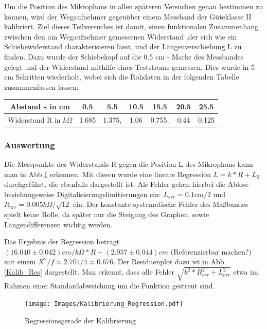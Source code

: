 \documentclass[]{article}
\begin{document}
	Um die Position des Mikrophons in allen späteren Versuchen genau bestimmen zu können, wird der Wegaufnehmer gegenüber einem Messband der Güteklasse II kalibriert. Ziel dieses Teilversuches ist damit, einen funktionalen Zusammenhang zwischen den am Wegaufnehmer gemessenen Widerstand ,der sich wie ein Schiebewiderstand charakterisieren lässt, und der Längenverschiebung L zu finden. Dazu wurde der Schiebekopf auf die 0.5 cm - Marke des Messbandes gelegt und der Widerstand mithilfe eines Teststroms gemessen. Dies wurde in 5-cm Schritten wiederholt, wobei sich die Rohdaten in der folgenden Tabelle zusammenfassen lassen:

	\begin{center}
	\begin{tabular}{|c|c|c|c|c|c|c|}
		\hline 
		Abstand s in cm & 0.5 & 5.5 & 10.5 & 15.5 & 20.5 & 25.5 \\ 
		\hline 
		Widerstand R in $k\Omega$ & 1.685 & 1.375, & 1.06 & 0.755, & 0.44 & 0.125 \\ 
		\hline 
	\end{tabular} 
	\end{center}

	\subsubsection{Auswertung}

	Die Messpunkte des Widerstands R gegen die Position L des Mikrophons kann man in Abb.\ref{Kalib_Reg} erkennen. Mit diesen wurde eine lineare Regression $L=k*R+L_0$ durchgeführt, die ebenfalls dargestellt ist. Als Fehler gehen hierbei die Ablese- beziehungsweise Digitalisierungslimitierungen ein: $L_{err}=0.1cm/2$ und $R_{err}=0.005k\Omega/\sqrt{12}$ ein. Der konstante systematische Fehler des Maßbandes spielt keine Rolle, da später nur die Steigung des Graphen, sowie Längendifferenzen wichtig werden.      

	Das Ergebnis der Regression beträgt  $(16.040\pm0.042)cm/k\Omega*R+(2.957\pm0.044)cm$ {\color{red} {(Referenzierbar machen?)}} mit einem $X^2/f \approx 2.704/4 \approx 0.676$. Der Residuenplot dazu ist in Abb.\ref{Kalib_Res} dargestellt. Man erkennt, dass alle Fehler $\sqrt{k^2*R_{err}^2+L_{err}^2}$ etwa im Rahmen einer Standardabweichung um die Funktion gestreut sind.\\   

	\begin{figure}
	\begin{center}
		\texttt{[image: Images/Kalibrierung\_Regression.pdf]}
		\caption{Regressionsgerade der Kalibrierung}             
		\label{Kalib_Reg}               
	\end{center}            
	\end{figure} 
\end{document}
